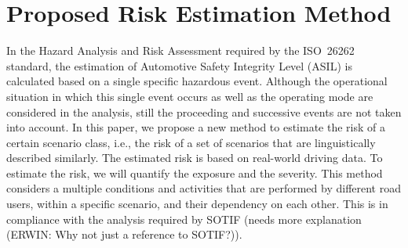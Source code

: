 \section{Proposed Risk Estimation Method} %
\label{sec:method}

%	
%	 
%
 
In the Hazard Analysis and Risk Assessment required by the ISO~26262 standard, the estimation of Automotive Safety Integrity Level (ASIL) is calculated based on a single specific hazardous event.
Although the operational situation in which this single event occurs as well as the operating mode are considered in the analysis, still the proceeding and successive events are not taken into account.
In this paper, we propose a new method to estimate the risk of a certain scenario class, i.e., the risk of a set of scenarios that are linguistically described similarly. The estimated risk is based on real-world driving data. To estimate the risk, we will quantify the exposure and the severity. This method considers a multiple conditions and activities that are performed by different road users, within a specific scenario, and their dependency on each other. This is in compliance with the analysis required by SOTIF (needs more explanation (ERWIN: Why not just a reference to SOTIF?)).

